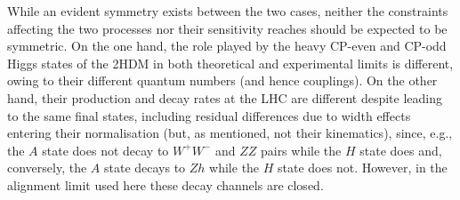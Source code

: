 While an evident symmetry exists between the two cases, neither the constraints affecting the two processes nor their  sensitivity reaches should be expected to be symmetric.
On the one hand, the role played by the heavy CP-even and CP-odd Higgs states of the 2HDM in both theoretical and experimental limits is different, owing to their different quantum numbers (and hence couplings).
On the other hand, their production and decay rates at the LHC are different despite leading to the same final states, including residual differences due to width effects entering their normalisation (but, as mentioned, not their kinematics), since, e.g., the $A$ state does not decay to $W^+W^-$ and $ZZ$ pairs while the $H$ state does and, conversely, the $A$ state decays to $Zh$ while the $H$ state does not.  
However, in the alignment limit used here these decay channels are closed.
